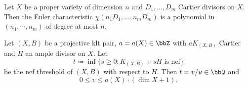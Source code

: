 
    \begin{lemma}\label{lem:Hilbert_polynomial}
        Let \(X\) be a proper variety of dimension \(n\) and \(D_1,\ldots,D_m\) Cartier divisors on \(X\).
        Then the Euler characteristic \(\chi(n_1D_1,\ldots,n_mD_m)\) is a polynomial in \((n_1,\cdots,n_m)\) of degree at most \(n\).
    \end{lemma}

    \begin{theorem}\label{thm: rationality theorem}
        Let \((X,B)\) be a projective klt pair, \(a = a(X) \in \bbZ\) with \(aK_{(X,B)}\) Cartier and \(H\) an ample divisor on \(X\).
        Let
        \[ t \coloneqq \inf \{s \geq 0: K_{(X,B)} + sH \text{ is nef}\} \]
        be the nef threshold of \((X,B)\) with respect to \(H\).
        Then \(t = v/u \in \bbQ\) and
        \[ 0 \leq v \leq a(X)\cdot (\dim X + 1). \]
    \end{theorem}

